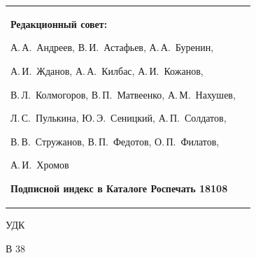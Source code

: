\begin{table}[t!]
\begin{center}
\begin{tabular}{p{7cm}p{6cm}}
{\bigskip \par

\textbf{Редакционный совет:}
\par \smallskip
А.\,А.~Андреев,
В.\,И.~Астафьев,
А.\,А.~Буренин,\par
А.\,И.~Жданов,
А.\,А.~Килбас,
А.\,И.~Кожанов,\par
В.\,Л.~Колмогоров,
\mbox{В.\,П.~Матвеенко,}
А.\,М.~Нахушев,\par
Л.\,С.~Пулькина,
Ю.\,Э.~Сеницкий,
А.\,П.~Солдатов,\par
В.\,В.~Стружанов,
В.\,П.~Федотов,
О.\,П.~Филатов,\par
А.\,И.~Хромов

\bigskip \par

\textbf{Подписной индекс в Каталоге Роспечать 18108}


}  \\
\end{tabular}

\end{center}
\end{table}


\clearpage

\thispagestyle{empty}

\noindent УДК  \allUDC
\par \noindent
В 38

\vfil

